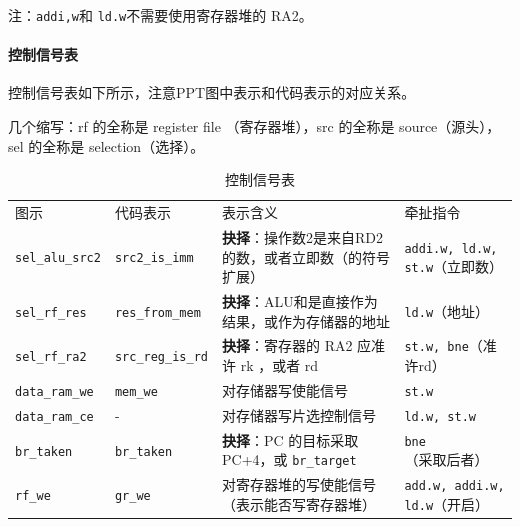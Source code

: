 \documentclass[UTF8]{ctexart}
\begin{document}
注：\verb!addi,w!和 \verb!ld.w!不需要使用寄存器堆的 RA2。

\paragraph{控制信号表}
控制信号表如下所示，注意PPT图中表示和代码表示的对应关系。

几个缩写：rf 的全称是 register file （寄存器堆），src 的全称是 source（源头），sel 的全称是 selection（选择）。

\begin{table}[H]
\small
    \centering
    \begin{tabular}{llp{}p{}}
        \rowcolor{cyan!50}
        图示 & 代码表示 & 表示含义 & 牵扯指令 \\

        \verb!sel_alu_src2! & \verb!src2_is_imm! & \textbf{抉择}：操作数2是来自RD2的数，或者立即数（的符号扩展） & \verb!addi.w, ld.w, st.w!（立即数） \\
        \verb!sel_rf_res! & \verb!res_from_mem! & \textbf{抉择}：ALU和是直接作为结果，或作为存储器的地址 & \verb!ld.w!（地址） \\
        \verb!sel_rf_ra2! & \verb!src_reg_is_rd! & \textbf{抉择}：寄存器的 RA2 应准许 rk ，或者 rd & \verb!st.w, bne!（准许rd） \\
        \verb!data_ram_we! & \verb!mem_we! & 对存储器写使能信号 & \verb!st.w! \\
        \verb!data_ram_ce! & - & 对存储器写片选控制信号 & \verb!ld.w, st.w! \\
        \verb!br_taken! & \verb!br_taken! & \textbf{抉择}：PC 的目标采取 PC+4，或 \verb!br_target! & \verb!bne!（采取后者） \\
        \verb!rf_we! & \verb!gr_we! & 对寄存器堆的写使能信号（表示能否写寄存器堆） & \verb!add.w, addi.w, ld.w!（开启） \\
    \end{tabular}
    \caption{控制信号表}\label{fig:control}
\end{table}
\end{document}
